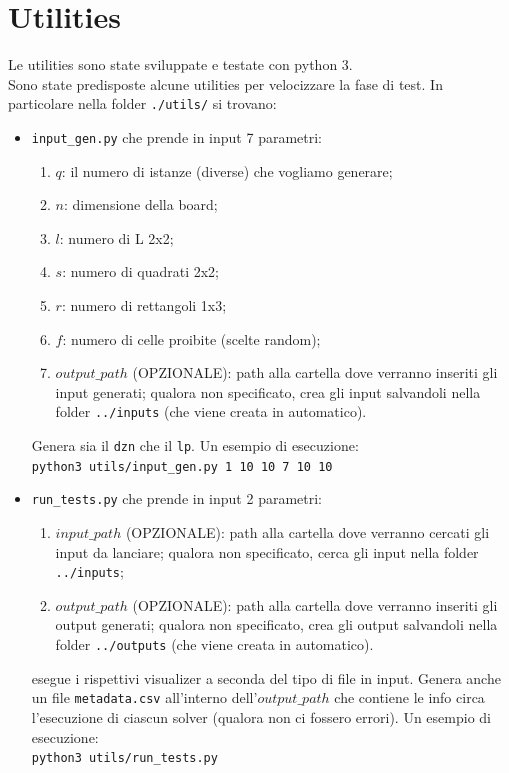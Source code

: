 \documentclass{article}
\begin{document}
\section{Utilities}
Le utilities sono state sviluppate e testate con python 3.\\
Sono state predisposte alcune utilities per velocizzare la fase di test. In particolare nella folder \texttt{./utils/} si trovano:
\begin{itemize}
    \item \texttt{input\_gen.py} che prende in input 7 parametri:
          \begin{enumerate}
              \item $q$: il numero di istanze (diverse) che vogliamo generare;
              \item $n$: dimensione della board;
              \item $l$: numero di L 2x2;
              \item $s$: numero di quadrati 2x2;
              \item $r$: numero di rettangoli 1x3;
              \item $f$: numero di celle proibite (scelte random);
              \item $output\_path$ (OPZIONALE): path alla cartella dove verranno inseriti gli input generati; qualora non specificato, crea gli input salvandoli nella folder \texttt{../inputs} (che viene creata in automatico).
          \end{enumerate}
          Genera sia il \texttt{dzn} che il \texttt{lp}. Un esempio di esecuzione:\\
          \texttt{python3 utils/input\_gen.py 1 10 10 7 10 10} 
    \item \texttt{run\_tests.py} che prende in input 2 parametri:
          \begin{enumerate}
              \item $input\_path$ (OPZIONALE): path alla cartella dove verranno cercati gli input da lanciare; qualora non specificato, cerca gli input nella folder \texttt{../inputs};
              \item $output\_path$ (OPZIONALE): path alla cartella dove verranno inseriti gli output generati; qualora non specificato, crea gli output salvandoli nella folder \texttt{../outputs} (che viene creata in automatico).
          \end{enumerate}
          esegue i rispettivi visualizer a seconda del tipo di file in input. Genera anche un file \texttt{metadata.csv} all'interno dell'$output\_path$ che contiene le info circa l'esecuzione di ciascun solver (qualora non ci fossero errori). Un esempio di esecuzione:\\
          \texttt{python3 utils/run\_tests.py}
\end{itemize}
\end{document}
